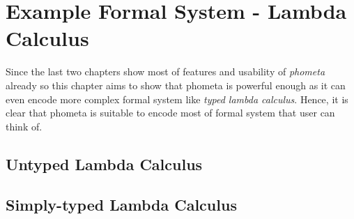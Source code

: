 \documentclass[master.tex]{subfiles}
\begin{document}
\chapter{Example Formal System - Lambda Calculus}
\label{chap:example_lambda_calculus}

Since the last two chapters show most of features and usability of \emph{phometa}
already so this chapter aims to show that phometa is powerful enough as it can
even encode more complex formal system like \emph{typed lambda calculus}. Hence,
it is clear that phometa is suitable to encode most of formal system that user
can think of.

\section{Untyped Lambda Calculus}
\section{Simply-typed Lambda Calculus}
\end{document}
